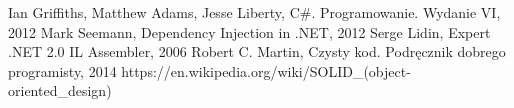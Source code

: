 \documentclass[12pt]{article}
\begin{document}
\newpage
\listoffigures
\listoftables

\newpage
\begin{thebibliography}{authordate1}
 Ian Griffiths, Matthew Adams, Jesse Liberty, C\#. Programowanie. Wydanie VI, 2012
 Mark Seemann, Dependency Injection in .NET, 2012
 Serge Lidin, Expert .NET 2.0 IL Assembler, 2006
 Robert C. Martin, Czysty kod. Podręcznik dobrego programisty, 2014
 https://en.wikipedia.org/wiki/SOLID\_(object-oriented\_design)
\end{thebibliography}
\end{document}
